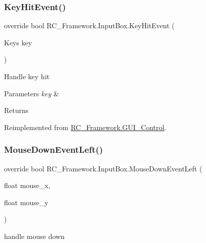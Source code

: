 \subsubsection{\texorpdfstring{Key\+Hit\+Event()}{KeyHitEvent()}}
{\footnotesize\ttfamily override bool R\+C\+\_\+\+Framework.\+Input\+Box.\+Key\+Hit\+Event (\begin{DoxyParamCaption}\item[{Keys}]{key }\end{DoxyParamCaption})\hspace{0.3cm}{\ttfamily [virtual]}}



Handle key hit 


\begin{DoxyParams}{Parameters}
{\em key} & \\
\hline
\end{DoxyParams}
\begin{DoxyReturn}{Returns}

\end{DoxyReturn}


Reimplemented from \mbox{\hyperlink{class_r_c___framework_1_1_g_u_i___control_a458eb00bda180db22ebe22e550a669a4}{R\+C\+\_\+\+Framework.\+G\+U\+I\+\_\+\+Control}}.

\mbox{\label{class_r_c___framework_1_1_input_box_a7e57c860483df9645d726d6adbbc6dab}} 
\subsubsection{\texorpdfstring{Mouse\+Down\+Event\+Left()}{MouseDownEventLeft()}}
{\footnotesize\ttfamily override bool R\+C\+\_\+\+Framework.\+Input\+Box.\+Mouse\+Down\+Event\+Left (\begin{DoxyParamCaption}\item[{float}]{mouse\+\_\+x,  }\item[{float}]{mouse\+\_\+y }\end{DoxyParamCaption})\hspace{0.3cm}{\ttfamily [virtual]}}



handle mouse down 


